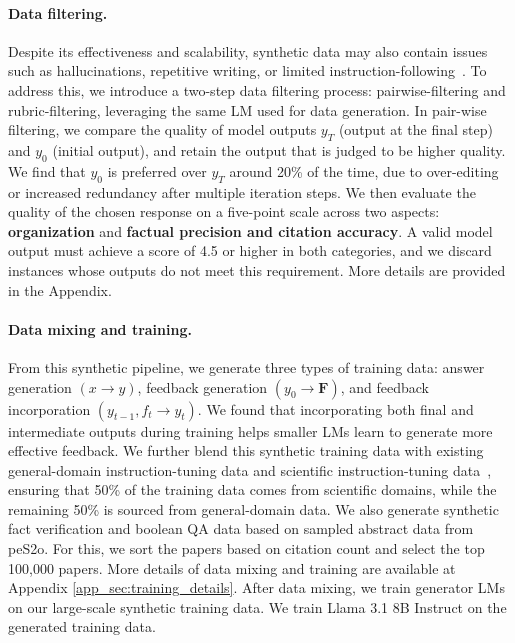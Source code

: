 \paragraph{Data filtering.}
Despite its effectiveness and scalability, synthetic data may also contain issues such as hallucinations, repetitive writing, or limited instruction-following~\citep{li-etal-2024-superfiltering}. 
To address this, we introduce a two-step data filtering process: pairwise-filtering and rubric-filtering, leveraging the same LM used for data generation. 
In pair-wise filtering, we compare the quality of model outputs $y_T$ (output at the final step) and $y_0$ (initial output), and retain the output that is judged to be higher quality. 
We find that $y_0$ is preferred over $y_T$ around 20\% of the time, due to over-editing or increased redundancy after multiple iteration steps. 
We then evaluate the quality of the chosen response on a five-point scale across two aspects: {\bf organization} and {\bf factual precision and citation accuracy}. A valid model output must achieve a score of 4.5 or higher in both categories, and we discard instances whose outputs do not meet this requirement. More details are provided in the Appendix. 

\paragraph{Data mixing and training.}
From this synthetic pipeline, we generate three types of training data: answer generation $(x \rightarrow y)$, feedback generation $(y_0 \rightarrow \mathbf{F})$, and feedback incorporation $(y_{t-1}, f_t \rightarrow y_{t})$. We found that incorporating both final and intermediate outputs during training helps smaller LMs learn to generate more effective feedback. 
We further blend this synthetic training data with existing general-domain instruction-tuning data \citep{ivison2023camels} and scientific instruction-tuning data~\citep{wadden2024sciriff}, ensuring that 50\% of the training data comes from scientific domains, while the remaining 50\% is sourced from general-domain data. 
We also generate synthetic fact verification and boolean QA data based on sampled abstract data from peS2o. For this, we sort the papers based on citation count and select the top 100,000 papers. 
More details of data mixing and training are available at Appendix \ref{app_sec:training_details}. 
After data mixing, we train generator LMs on our large-scale synthetic training data. We train Llama 3.1 8B Instruct on the generated training data. 